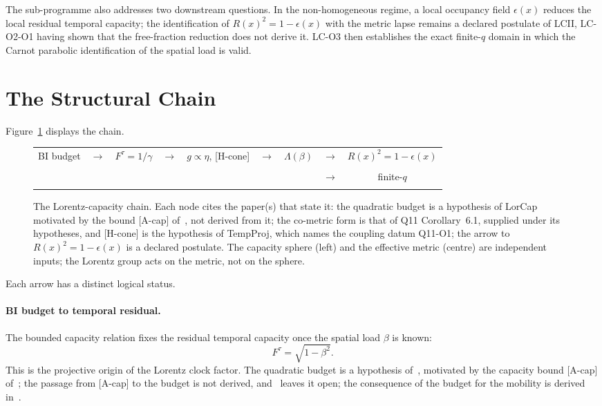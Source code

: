 \documentclass[12pt,a4paper]{article}
\theoremstyle{remark}
\begin{document}
    The sub-programme also addresses two downstream questions.
    In the non-homogeneous regime, a local occupancy field $\epsilon(x)$ reduces the local
    residual temporal capacity; the identification of $R(x)^2 = 1-\epsilon(x)$ with the metric
    lapse remains a declared postulate of LCII, LC-O2-O1 having shown that the free-fraction
    reduction does not derive it.
    LC-O3 then establishes the exact finite-$q$ domain in which the Carnot parabolic
    identification of the spatial load is valid.

  \section{The Structural Chain}
    \label{sec:chain}

    Figure~\ref{fig:chain} displays the chain.

    \begin{figure}[h]
      \centering
      \renewcommand{\arraystretch}{1.5}
      \footnotesize
      \begin{tabular}{ccccccccc}
        BI budget & $\to$ & $F^\tau=1/\gamma$ & $\to$ & $g\propto\eta$, [H-cone]
        & $\to$ & $\Lambda(\beta)$ & $\to$ & $R(x)^2=1-\epsilon(x)$\\
        \cite{Beau2026n} & &
        \cite{Beau2026n,Beau2026tp} & &
        \cite{Beau2026q11,Beau2026tp} & &
        \cite{Beau2026lco1} & &
        \cite{Beau2026lco2,Beau2026lco2o1}\\[6pt]
        \multicolumn{7}{c}{} & $\to$ & finite-$q$ \\
        \multicolumn{7}{c}{} & & \cite{Beau2026lco3}
      \end{tabular}
      \caption{The Lorentz-capacity chain.
      Each node cites the paper(s) that state it: the quadratic budget is a hypothesis of LorCap motivated by the bound
      [A-cap] of~\cite{Beau2026c}, not derived from it; the co-metric form is that of Q11 Corollary~6.1, supplied under its hypotheses,
      and [H-cone] is the hypothesis of TempProj, which names the coupling datum Q11-O1; the arrow to
      $R(x)^2 = 1-\epsilon(x)$ is a declared postulate.
      The capacity sphere (left) and the effective metric (centre) are independent inputs;
      the Lorentz group acts on the metric, not on the sphere.}
      \label{fig:chain}
    \end{figure}

    Each arrow has a distinct logical status.

    \paragraph{BI budget to temporal residual.}
      The bounded capacity relation fixes the residual temporal capacity once the spatial load
      $\beta$ is known:
      \[
        F^\tau = \sqrt{1-\beta^2}.
      \]
      This is the projective origin of the Lorentz clock factor.
      The quadratic budget is a hypothesis of~\cite{Beau2026n}, motivated by the capacity bound [A-cap]
      of~\cite{Beau2026c}; the passage from [A-cap] to the budget is not derived, and~\cite{Beau2026c} leaves it
      open; the consequence of the budget for the mobility is derived in~\cite{Beau2026n}.
\end{document}
